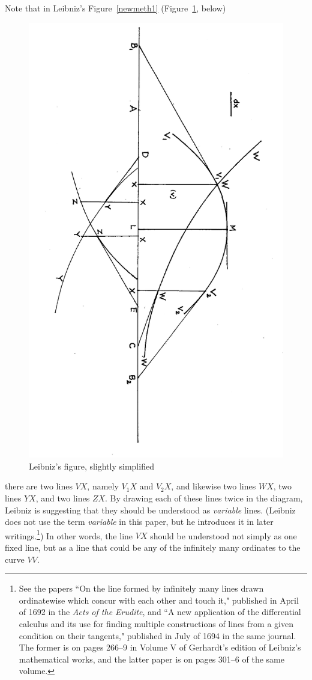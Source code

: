 \documentclass[twoside,openright]{article}
\begin{document}
Note that in Leibniz's Figure~\ref{newmeth1} (Figure~\ref{newmeth1A}, below)
\begin{figure}[htp]
\begin{center}
\includegraphics[width=.85\textwidth]{fig/Figure2A}
\caption{Leibniz's figure, slightly simplified}
\label{newmeth1A}
\end{center}
\end{figure}
 there are two lines $VX$, namely $V_1X$ and $V_2X$, and likewise two lines $WX$, two lines $YX$, and two lines $ZX$.  By drawing each of these lines twice in the diagram, Leibniz is suggesting that they should be understood as {\em variable} lines. (Leibniz does not use the term {\em variable} in this paper, but he introduces it in later writings.\footnote{See the papers ``On the line formed by infinitely many lines drawn ordinatewise which concur with each other and touch it," published in April of 1692 in the {\em Acts of the Erudite}, and ``A new application of the differential calculus and its use for finding multiple constructions of lines from a given condition on their tangents," published in July of 1694 in the same journal.  The former is on pages 266--9 in Volume V of Gerhardt's edition of Leibniz's mathematical works, and the latter paper is on pages 301--6 of the same volume.})  In other words, the line $VX$ should be understood not simply as one fixed line, but as a line that could be any of the infinitely many ordinates to the curve $VV$.
\end{document}
